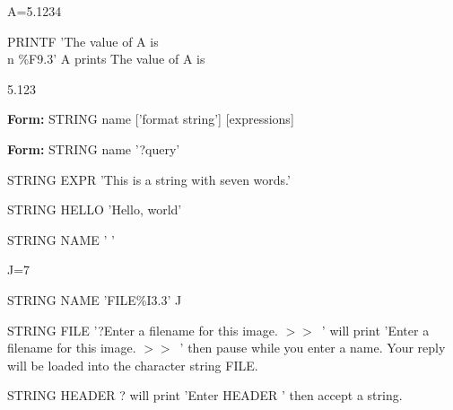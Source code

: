 {\newpage\clearpage
{}%
\begin{example}
  \item[A=5.1234\hfill]{}
  \item[PRINTF 'The value of A is \\n    \%F9.3' A\hfill]{prints
The value of A is}
  \item{5.123}
\end{example}%
\lthtmlfigureZ
\lthtmlcheckvsize\clearpage}

{\newpage\clearpage
{}%
\begin{command}
  \item[\textbf{Form: } STRING name {['format string']} {[expressions]}\hfill]{}
  \item[\textbf{Form: } STRING name '?query']{}
\end{command}%
\lthtmlfigureZ
\lthtmlcheckvsize\clearpage}

{\newpage\clearpage
{}%
\begin{example}
  \item[STRING EXPR  'This is a string with seven words.'\hfill]{}
  \item[STRING HELLO 'Hello, world'\hfill]{}
\end{example}%
\lthtmlfigureZ
\lthtmlcheckvsize\clearpage}

{\newpage\clearpage
{}%
\begin{hanging}
  \item{STRING NAME ' '}
\end{hanging}%
\lthtmlfigureZ
\lthtmlcheckvsize\clearpage}

{\newpage\clearpage
{}%
\begin{hanging}
  \item{J=7}
  \item{STRING NAME 'FILE\%I3.3' J}
\end{hanging}%
\lthtmlfigureZ
\lthtmlcheckvsize\clearpage}

{\newpage\clearpage
{}%
\begin{example}
  \item[STRING FILE '?Enter a filename for this image. $>>$\  '\hfill]{ will
   print 'Enter a filename for this image. $>>$\  ' then pause while you
   enter a name.  Your reply will be loaded into the character string
   FILE.}
\par
\item[STRING HEADER ?\hfill]{ will print 'Enter HEADER ' then accept a
        string.}
\end{example}%
\lthtmlfigureZ
\lthtmlcheckvsize\clearpage}

